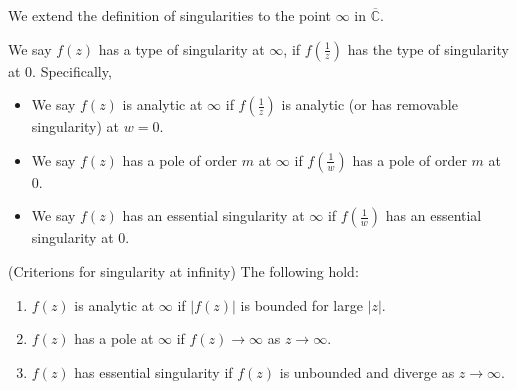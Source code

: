 We extend the definition of singularities to the point $\infty $ in $\overline{\mathbb{C}} $.

\begin{definition}

	We say $f(z)$ has a type of singularity at $\infty $, if $f(\frac{1}{z})$ has the type of singularity at $0$. Specifically,
	\begin{itemize}
		\item 
	We say $f(z)$ is analytic at $\infty $ if $f(\frac{1}{z})$ is analytic (or has removable singularity) at $w = 0$.
\item
	We say $f(z)$ has a pole of order $m$ at $\infty $ if $f(\frac{1}{w})$ has a pole of order $m$ at $0$.
\item 
	We say $f(z)$ has an essential singularity at $\infty $ if $f(\frac{1}{w})$ has an essential singularity at $0$.
	\end{itemize}
\end{definition}
\begin{proposition}
	(Criterions for singularity at infinity)
	The following hold:
	\begin{enumerate}
		\item $f(z)$ is analytic at $\infty $ if $|f(z)|$ is bounded for large $|z|$.
		\item $f(z)$ has a pole at $\infty $ if $f(z) \to \infty $ as  $z\to \infty $.
		\item $f(z)$ has essential singularity if $f(z)$ is unbounded and diverge as $z \to \infty $.
	\end{enumerate}
\end{proposition}

